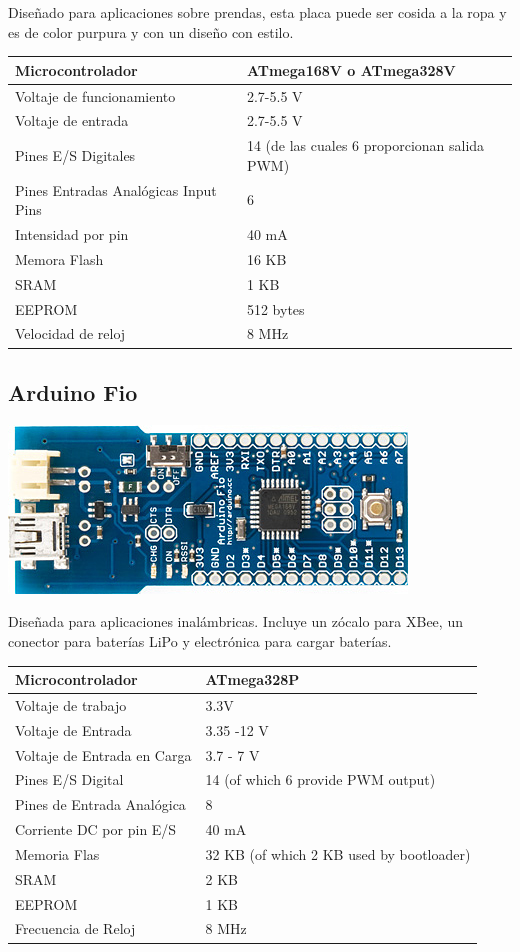 \documentclass[12pt,a4paper]{report}
\begin{document}
Diseñado para aplicaciones sobre prendas, esta placa puede ser cosida a la ropa
y es de color purpura y con un diseño con estilo. 

\begin{tabular}{||l | l ||}
\hline
\hline
Microcontrolador & ATmega168V o ATmega328V\\
\hline
Voltaje de funcionamiento & 2.7-5.5 V\\
\hline
Voltaje de entrada & 2.7-5.5 V\\
\hline
Pines E/S Digitales & 14 (de las cuales 6 proporcionan salida PWM)\\
\hline
Pines Entradas Analógicas Input Pins & 6\\
\hline
Intensidad por pin & 40 mA\\
\hline
Memora Flash & 16 KB \\
\hline
SRAM & 1 KB\\
\hline
EEPROM & 512 bytes\\
\hline
Velocidad de reloj & 8 MHz\\
\hline
\hline
\end{tabular}


\subsection{Arduino Fio}

\includegraphics[scale=0.6]{ArduinoFio.jpg}

Diseñada para aplicaciones inalámbricas. Incluye un zócalo para XBee, un
conector para baterías LiPo y electrónica para cargar baterías. 

\begin{tabular}{||l | l ||}
\hline
\hline
Microcontrolador & ATmega328P\\
\hline
Voltaje de trabajo & 3.3V\\
\hline
Voltaje de Entrada & 3.35 -12 V\\
\hline
Voltaje de Entrada en Carga & 3.7 - 7 V\\
\hline
Pines E/S Digital & 14 (of which 6 provide PWM output)\\
\hline
Pines de Entrada Analógica & 8\\
\hline
Corriente DC por pin E/S & 40 mA\\
\hline
Memoria Flas & 	32 KB (of which 2 KB used by bootloader)\\
\hline
SRAM & 2 KB\\
\hline
EEPROM & 1 KB\\
\hline
Frecuencia de Reloj & 8 MHz\\
\hline
\hline
\end{tabular}
\end{document}
